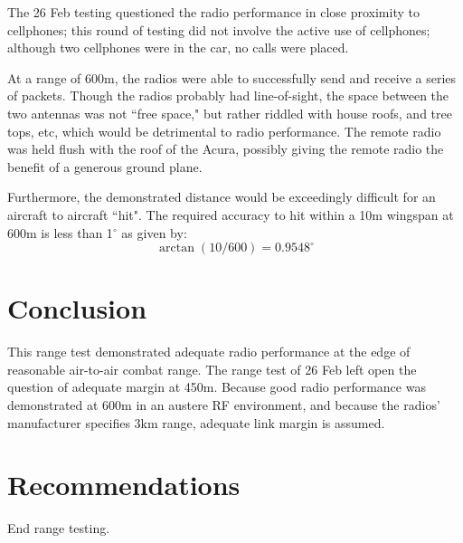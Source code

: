 \documentclass[11pt,letterpaper]{article}
\begin{document}
The 26 Feb testing questioned the radio performance in close proximity to cellphones; this round of testing did not involve the active use of cellphones; although two cellphones were in the car, no calls were placed.

At a range of 600m, the radios were able to successfully send and receive a series of packets.  Though the radios probably had line-of-sight, the space between the two antennas was not ``free space," but rather riddled with house roofs, and tree tops, etc, which would be detrimental to radio performance.  The remote radio was held flush with the 
roof of the Acura, possibly giving the remote radio the benefit of a generous ground plane.

Furthermore, the demonstrated distance would be exceedingly difficult for an aircraft to aircraft ``hit".  The required accuracy to hit within a 10m wingspan at 600m is less than 1$^\circ$ as given by:
\[\arctan (10/600) = 0.9548^\circ  \]


\section{Conclusion}

This range test demonstrated adequate radio performance at the edge of reasonable air-to-air combat range.  The range test of 26 Feb left open the question of adequate margin at 450m.  Because good radio performance was demonstrated at 600m in an austere RF environment, and because the radios' manufacturer specifies 3km range, adequate link margin is assumed.  

\section{Recommendations}
End range testing.
\end{document}

